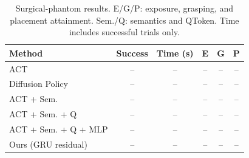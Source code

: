\begin{table}[!tb]
\caption{Surgical-phantom results. E/G/P: exposure, grasping, and placement attainment. Sem./Q: semantics and QToken. Time includes successful trials only.}
\label{tab:crosstaskresults}
\centering\small
\setlength{\tabcolsep}{2pt}
\begin{tabular}{p{}ccccc}
\toprule
Method & Success & Time (s) & E & G & P\\
\midrule
ACT & -- & -- & -- & -- & --\\
Diffusion Policy & -- & -- & -- & -- & --\\
ACT + Sem. & -- & -- & -- & -- & --\\
ACT + Sem. + Q & -- & -- & -- & -- & --\\
ACT + Sem. + Q + MLP & -- & -- & -- & -- & --\\
Ours (GRU residual) & -- & -- & -- & -- & --\\
\bottomrule
\end{tabular}
\end{table}
